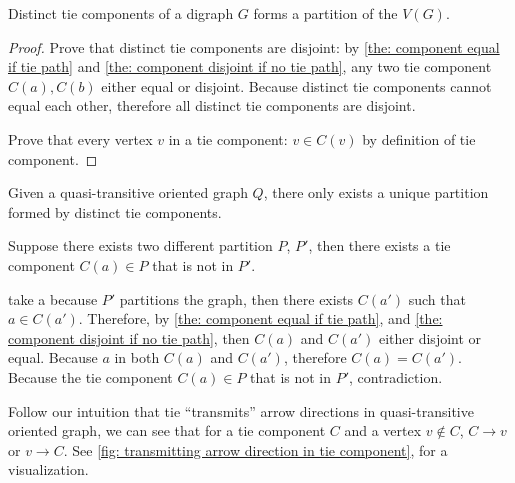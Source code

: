 \begin{theorem}\label{the: tie component partition}
  Distinct tie components of a digraph \(G\) forms a partition
  of the \(V(G)\).
\end{theorem}

\begin{proof}
  Prove that distinct tie components are disjoint:
  by \cref{the: component equal if tie path} and
  \cref{the: component disjoint if no tie path},
  any two tie component \(C(a), C(b)\) either equal or disjoint.
  Because distinct tie components cannot equal each other,
  therefore all distinct tie components are disjoint.

  Prove that every vertex \(v\) in a tie component:
  \(v \in C(v)\) by definition of tie component.
\end{proof}

\begin{theorem}\label{the: tie components partition unique}
  Given a quasi-transitive oriented graph \(Q\),
  there only exists a unique partition formed by
  distinct tie components.
\end{theorem}

\begin{theorem}
  Suppose there exists two different partition \(P\), \(P'\),
  then there exists a tie component \(C(a) \in P\) that is
  not in \(P'\).

  take a because \(P'\) partitions the graph,
  then there exists \(C(a')\) such that \(a \in C(a')\).
  Therefore, by \cref{the: component equal if tie path},
  and \cref{the: component disjoint if no tie path},
  then \(C(a)\) and \(C(a')\) either disjoint or equal.
  Because \(a\) in both \(C(a)\) and \(C(a')\),
  therefore \(C(a) = C(a')\).
  Because the tie component \(C(a) \in P\) that is
  not in \(P'\), contradiction.
\end{theorem}

Follow our intuition that tie ``transmits'' arrow directions
in quasi-transitive oriented graph,
we can see that for a tie component \(C\)
and a vertex \(v \notin C\), \(C \to v\) or \(v \to C\).
See \cref{fig: transmitting arrow direction in tie component},
for a visualization.

